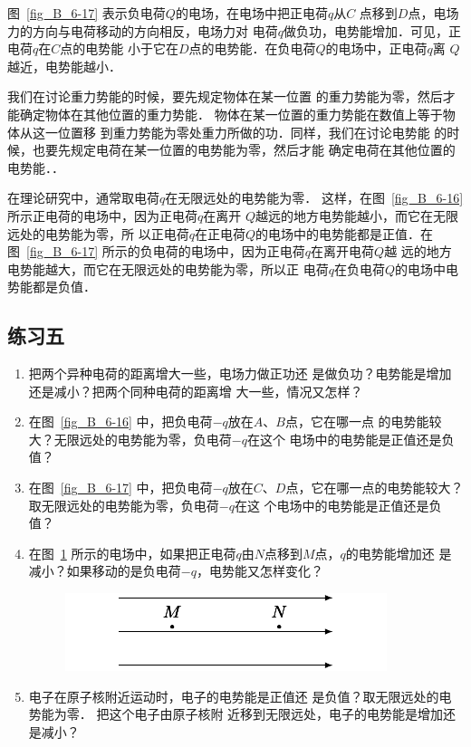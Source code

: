 图~\ref{fig_B_6-17} 表示负电荷$Q$的电场，在电场中把正电荷$q$从$C$
点移到$D$点，电场力的方向与电荷移动的方向相反，电场力对
电荷$q$做负功，电势能增加．可见，正电荷$q$在$C$点的电势能
小于它在$D$点的电势能．在负电荷$Q$的电场中，正电荷$q$离
$Q$越近，电势能越小．

我们在讨论重力势能的时候，要先规定物体在某一位置
的重力势能为零，然后才能确定物体在其他位置的重力势能．
物体在某一位置的重力势能在数值上等于物体从这一位置移
到重力势能为零处重力所做的功．同样，我们在讨论电势能
的时候，也要先规定电荷在某一位置的电势能为零，然后才能
确定电荷在其他位置的电势能．．

在理论研究中，通常取电荷$q$在无限远处的电势能为零．
这样，在图~\ref{fig_B_6-16} 所示正电荷的电场中，因为正电荷$q$在离开
$Q$越远的地方电势能越小，而它在无限远处的电势能为零，所
以正电荷$q$在正电荷$Q$的电场中的电势能都是正值．在图~\ref{fig_B_6-17} 
所示的负电荷的电场中，因为正电荷$q$在离开电荷$Q$越
远的地方电势能越大，而它在无限远处的电势能为零，所以正
电荷$q$在负电荷$Q$的电场中电势能都是负值．


\subsection*{练习五}

\begin{enumerate}
    \item 把两个异种电荷的距离增大一些，电场力做正功还
是做负功？电势能是增加还是减小？把两个同种电荷的距离增
大一些，情况又怎样？
\item 在图~\ref{fig_B_6-16} 中，把负电荷$-q$放在$A$、$B$点，它在哪一点
的电势能较大？无限远处的电势能为零，负电荷$-q$在这个
电场中的电势能是正值还是负值？
\item 在图~\ref{fig_B_6-17} 中，把负电荷$-q$放在$C$、$D$点，它在哪一点的电势能较大？取无限远处的电势能为零，负电荷$-q$在这
个电场中的电势能是正值还是负值？
\item 在图~\ref{fig_B_6-18} 所示的电场中，如果把正电荷$q$由$N$点移到$M$点，$q$的电势能增加还
是减小？如果移动的是负电荷$-q$，电势能又怎样变化？
\begin{figure}[htbp]
    \centering
    \includegraphics{fig/B/6-18.pdf}
    \caption{}\label{fig_B_6-18}
\end{figure}    

\item  电子在原子核附近运动时，电子的电势能是正值还
是负值？取无限远处的电势能为零．
把这个电子由原子核附
近移到无限远处，电子的电势能是增加还是减小？
\end{enumerate}



